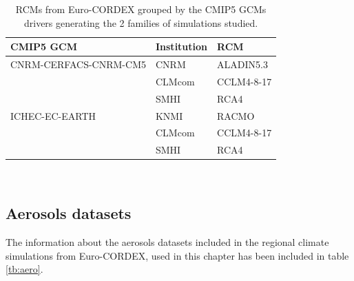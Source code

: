 \begin{table}[h]
\caption[RCMs from Euro-CORDEX grouped by the CMIP5 GCMs drivers generating the 2 families of simulations studied]{\label{tb:families}RCMs from Euro-CORDEX grouped by the CMIP5 GCMs drivers generating the 2 families of simulations studied.}
\footnotesize
\begin{tabular}{>{\raggedrigth}m{4.5cm}>{\raggedright}m{3cm}>{\raggedright}m{3cm}}
\toprule 
CMIP5 GCM & Institution  & RCM  \tabularnewline
\midrule
CNRM-CERFACS-CNRM-CM5 & CNRM & ALADIN5.3 \tabularnewline
&CLMcom&CCLM4-8-17\tabularnewline 
&SMHI&RCA4\tabularnewline
\midrule  
ICHEC-EC-EARTH&KNMI&RACMO\tabularnewline
&CLMcom&CCLM4-8-17\tabularnewline
&SMHI&RCA4\tabularnewline
\bottomrule
\end{tabular}\\
\end{table}
\normalsize



\subsection{Aerosols datasets}


The information about the aerosols datasets included in the regional climate simulations from Euro-CORDEX, used in this chapter has been included in table \ref{tb:aero}. %

